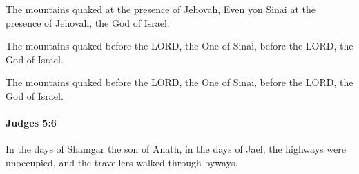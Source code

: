 			\begin{versebox}
					\item[BHS] 
					\item[ASV] The mountains quaked at the presence of Jehovah, Even yon Sinai at the presence of Jehovah, the God of Israel.
					\item[NIV] The mountains quaked before the LORD, the One of Sinai, before the LORD, the God of Israel.
					\item[NRSV] The mountains quaked before the LORD, the One of Sinai, before the LORD, the God of Israel.
			\end{versebox}

		\paragraph{Judges 5:6} %
			\label{JUDGES-5-6}

			In the days of Shamgar the son of Anath, in the days of Jael, the highways were unoccupied, and the travellers walked through byways.

